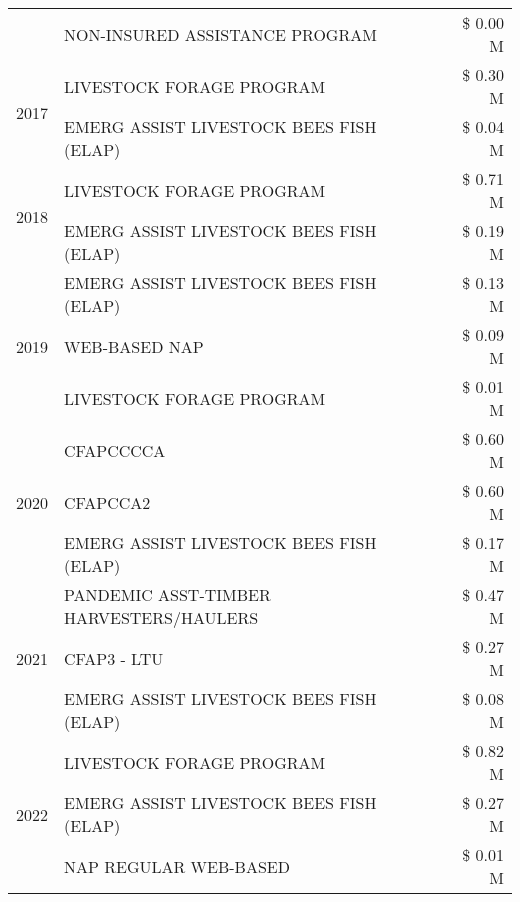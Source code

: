 \begin{tabular}{llr}
 & NON-INSURED ASSISTANCE PROGRAM & \$ 0.00 M \\
\cline{1-3}
\multirow[t]{2}{*}{2017} & LIVESTOCK FORAGE PROGRAM & \$ 0.30 M \\
 & EMERG ASSIST LIVESTOCK BEES FISH (ELAP) & \$ 0.04 M \\
\cline{1-3}
\multirow[t]{2}{*}{2018} & LIVESTOCK FORAGE PROGRAM & \$ 0.71 M \\
 & EMERG ASSIST LIVESTOCK BEES FISH (ELAP) & \$ 0.19 M \\
\cline{1-3}
\multirow[t]{3}{*}{2019} & EMERG ASSIST LIVESTOCK BEES FISH (ELAP) & \$ 0.13 M \\
 & WEB-BASED NAP & \$ 0.09 M \\
 & LIVESTOCK FORAGE PROGRAM & \$ 0.01 M \\
\cline{1-3}
\multirow[t]{3}{*}{2020} & CFAPCCCCA & \$ 0.60 M \\
 & CFAPCCA2 & \$ 0.60 M \\
 & EMERG ASSIST LIVESTOCK BEES FISH (ELAP) & \$ 0.17 M \\
\cline{1-3}
\multirow[t]{3}{*}{2021} & PANDEMIC ASST-TIMBER HARVESTERS/HAULERS & \$ 0.47 M \\
 & CFAP3 - LTU & \$ 0.27 M \\
 & EMERG ASSIST LIVESTOCK BEES FISH (ELAP) & \$ 0.08 M \\
\cline{1-3}
\multirow[t]{3}{*}{2022} & LIVESTOCK FORAGE PROGRAM & \$ 0.82 M \\
 & EMERG ASSIST LIVESTOCK BEES FISH (ELAP) & \$ 0.27 M \\
 & NAP REGULAR WEB-BASED & \$ 0.01 M \\
\cline{1-3}
\bottomrule
\end{tabular}
